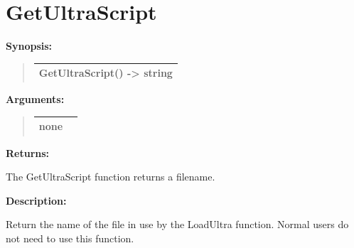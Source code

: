 \documentclass[letterpaper,10pt,english]{sphinxmanual}
\begin{document}
\section{GetUltraScript}
\label{functions:getultrascript}
\begin{DUlineblock}{0em}
\item[] \textbf{Synopsis:}
\end{DUlineblock}
\begin{quote}

\begin{tabulary}{\linewidth}{|L|}
\hline

GetUltraScript() -\textgreater{} string
\\
\hline\end{tabulary}

\end{quote}

\begin{DUlineblock}{0em}
\item[] 
\item[] \textbf{Arguments:}
\end{DUlineblock}
\begin{quote}

\begin{tabulary}{\linewidth}{|L|L|}
\hline

none
 & \\
\hline\end{tabulary}

\end{quote}

\begin{DUlineblock}{0em}
\item[] 
\item[] \textbf{Returns:}
\item[] The GetUltraScript function returns a filename.
\item[] 
\item[] \textbf{Description:}
\item[] Return the name of the file in use by the LoadUltra function. Normal users do
not need to use this function.
\end{DUlineblock}

\begin{DUlineblock}{0em}
\item[] 
\end{DUlineblock}
\end{document}
